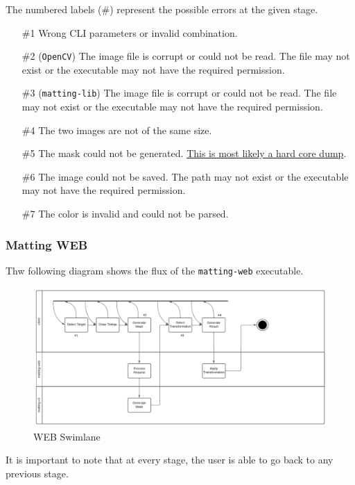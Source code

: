 \documentclass[a4paper]{article}
\begin{document}
The numbered labels (\#) represent the possible errors at the given stage.

\begin{itemize}
    \item[\#1] Wrong CLI parameters or invalid combination.
    \item[\#2] (\texttt{OpenCV}) The image file is corrupt or could not be read.
        The file may not exist or the executable may not have the required
        permission.
    \item[\#3] (\texttt{matting-lib}) The image file is corrupt or could not be read.
        The file may not exist or the executable may not have the required
        permission.
    \item[\#4] The two images are not of the same size.
    \item[\#5] The mask could not be generated. \underline{This is most likely a hard core dump}.
    \item[\#6] The image could not be saved. The path may not exist or the executable
        may not have the required permission.
    \item[\#7] The color is invalid and could not be parsed.
\end{itemize}

\pagebreak

\subsubsection{Matting WEB}

Thw following diagram shows the flux of the \texttt{matting-web} executable.

\begin{figure}[h]
    \includegraphics[width=\textwidth]{media/swimlane3.pdf}
    \caption{WEB Swimlane}
\end{figure}

It is important to note that at every stage, the user is able
to go back to any previous stage.
\end{document}
